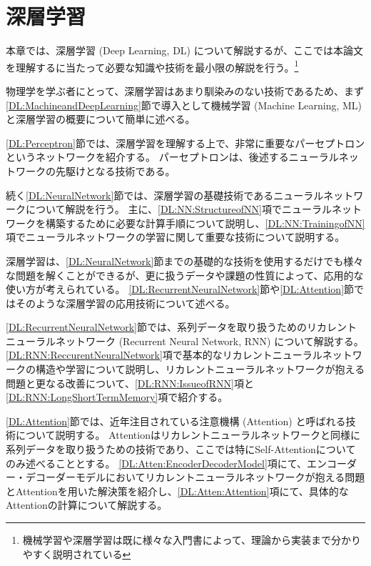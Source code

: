 
\chapter{深層学習} \label{chap:DeepLearning}

本章では、深層学習 (Deep Learning, DL) について解説するが、ここでは本論文を理解するに当たって必要な知識や技術を最小限の解説を行う。\footnote{機械学習や深層学習は既に様々な入門書\cite{ZeroDeepLearning1, ZeroDeepLearning2, PythonMLPrograming}によって、理論から実装まで分かりやすく説明されている}

物理学を学ぶ者にとって、深層学習はあまり馴染みのない技術であるため、まず\ref{DL:MachineandDeepLearning}節で導入として機械学習 (Machine Learning, ML) と深層学習の概要について簡単に述べる。

\ref{DL:Perceptron}節では、深層学習を理解する上で、非常に重要なパーセプトロンというネットワークを紹介する。
パーセプトロンは、後述するニューラルネットワークの先駆けとなる技術である。

続く\ref{DL:NeuralNetwork}節では、深層学習の基礎技術であるニューラルネットワークについて解説を行う。
主に、\ref{DL:NN:StructureofNN}項でニューラルネットワークを構築するために必要な計算手順について説明し、\ref{DL:NN:TrainingofNN}項でニューラルネットワークの学習に関して重要な技術について説明する。

深層学習は、\ref{DL:NeuralNetwork}節までの基礎的な技術を使用するだけでも様々な問題を解くことができるが、更に扱うデータや課題の性質によって、応用的な使い方が考えられている。
\ref{DL:RecurrentNeuralNetwork}節や\ref{DL:Attention}節ではそのような深層学習の応用技術について述べる。

\ref{DL:RecurrentNeuralNetwork}節では、系列データを取り扱うためのリカレントニューラルネットワーク (Recurrent Neural Network, RNN) について解説する。
\ref{DL:RNN:ReccurentNeuralNetwork}項で基本的なリカレントニューラルネットワークの構造や学習について説明し、リカレントニューラルネットワークが抱える問題と更なる改善について、\ref{DL:RNN:IssueofRNN}項と\ref{DL:RNN:LongShortTermMemory}項で紹介する。

\ref{DL:Attention}節では、近年注目されている注意機構 (Attention) と呼ばれる技術について説明する。
Attentionはリカレントニューラルネットワークと同様に系列データを取り扱うための技術であり、ここでは特にSelf-Attentionについてのみ述べることとする。
\ref{DL:Atten:EncoderDecoderModel}項にて、エンコーダー・デコーダーモデルにおいてリカレントニューラルネットワークが抱える問題とAttentionを用いた解決策を紹介し、\ref{DL:Atten:Attention}項にて、具体的なAttentionの計算について解説する。

